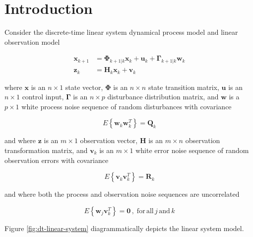 \section{Introduction}
\label{Introduction}

Consider the discrete-time linear system dynamical process model and linear observation model

\begin{equation*}
    \begin{aligned}
        \mathbf{x}_{k+1} &= \mathbf{\Phi}_{k+1|k} \mathbf{x}_k + \mathbf{u}_k + \mathbf{\Gamma}_{k+1|k} \mathbf{w}_k \\
        \mathbf{z}_k &= \mathbf{H}_k \mathbf{x}_k + \mathbf{v}_k
    \end{aligned}
\end{equation*}

where $\mathbf{x}$ is an $n \times 1$ state vector,
$\mathbf{\Phi}$ is an $n \times n$ state transition matrix,
$\mathbf{u}$ is an $n \times 1$ control input,
$\mathbf{\Gamma}$ is an $n \times p$ disturbance distribution matrix,
and $\mathbf{w}$ is a $p \times 1$ white process noise sequence of random disturbances with covariance

\begin{equation*}
    E \left\{ \mathbf{w}_k \mathbf{w}_k^T \right\} = \mathbf{Q}_k
\end{equation*}

and where $\mathbf{z}$ is an $m \times 1$ observation vector,
$\mathbf{H}$ is an $m \times n$ observation transformation matrix,
and $\mathbf{v}_k$ is an $m \times 1$ white error noise sequence of random observation errors with covariance

\begin{equation*}
    E \left\{ \mathbf{v}_k \mathbf{v}_k^T \right\} = \mathbf{R}_k
\end{equation*}

and where both the process and observation noise sequences are uncorrelated

\begin{equation*}
    E \left\{ \mathbf{w}_j \mathbf{v}_k^T \right\} = \mathbf{0} \, , \phantom{.} \mathrm{for} \, \mathrm{all} \, j \, \mathrm{and} \, k
\end{equation*}

Figure \ref{fig:dt-linear-system} diagrammatically depicts the linear system model.

